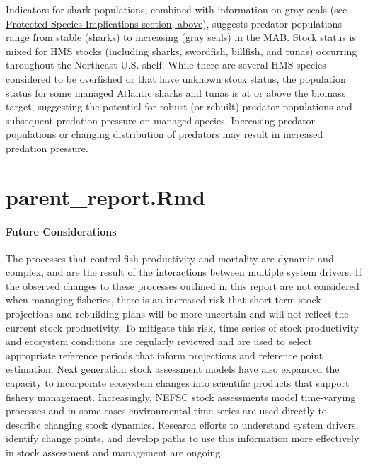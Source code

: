 \documentclass[
  10pt,
]{article}
\begin{document}
Indicators for shark populations, combined with information on gray seals (see \hyperref[protected-species]{Protected Species Implications section, above}), suggests predator populations range from stable (\href{https://noaa-edab.github.io/catalog/hms_cpue.html}{sharks}) to increasing (\href{https://noaa-edab.github.io/catalog/seal_pups.html}{gray seals}) in the MAB. \href{https://noaa-edab.github.io/catalog/hms_stock_status.html}{Stock status} is mixed for HMS stocks (including sharks, swordfish, billfish, and tunas) occurring throughout the Northeast U.S. shelf. While there are several HMS species considered to be overfished or that have unknown stock status, the population status for some managed Atlantic sharks and tunas is at or above the biomass target, suggesting the potential for robust (or rebuilt) predator populations and subsequent predation pressure on managed species. Increasing predator populations or changing distribution of predators may result in increased predation pressure.

\section{parent\_report.Rmd}\label{parent_report.rmd-7}

\paragraph{Future Considerations}\label{future-considerations-2}

The processes that control fish productivity and mortality are dynamic and complex, and are the result of the interactions between multiple system drivers. If the observed changes to these processes outlined in this report are not considered when managing fisheries, there is an increased risk that short-term stock projections and rebuilding plans will be more uncertain and will not reflect the current stock productivity. To mitigate this risk, time series of stock productivity and ecosystem conditions are regularly reviewed and are used to select appropriate reference periods that inform projections and reference point estimation. Next generation stock assessment models have also expanded the capacity to incorporate ecosystem changes into scientific products that support fishery management. Increasingly, NEFSC stock assessments model time-varying processes and in some cases environmental time series are used directly to describe changing stock dynamics. Research efforts to understand system drivers, identify change points, and develop paths to use this information more effectively in stock assessment and management are ongoing.
\end{document}

